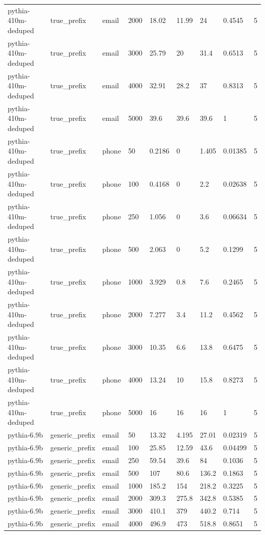 \begin{tabular}{lllllllll}
pythia-410m-deduped & true\_prefix & email & 2000 & 18.02 & 11.99 & 24 & 0.4545 & 5 \\
pythia-410m-deduped & true\_prefix & email & 3000 & 25.79 & 20 & 31.4 & 0.6513 & 5 \\
pythia-410m-deduped & true\_prefix & email & 4000 & 32.91 & 28.2 & 37 & 0.8313 & 5 \\
pythia-410m-deduped & true\_prefix & email & 5000 & 39.6 & 39.6 & 39.6 & 1 & 5 \\
pythia-410m-deduped & true\_prefix & phone & 50 & 0.2186 & 0 & 1.405 & 0.01385 & 5 \\
pythia-410m-deduped & true\_prefix & phone & 100 & 0.4168 & 0 & 2.2 & 0.02638 & 5 \\
pythia-410m-deduped & true\_prefix & phone & 250 & 1.056 & 0 & 3.6 & 0.06634 & 5 \\
pythia-410m-deduped & true\_prefix & phone & 500 & 2.063 & 0 & 5.2 & 0.1299 & 5 \\
pythia-410m-deduped & true\_prefix & phone & 1000 & 3.929 & 0.8 & 7.6 & 0.2465 & 5 \\
pythia-410m-deduped & true\_prefix & phone & 2000 & 7.277 & 3.4 & 11.2 & 0.4562 & 5 \\
pythia-410m-deduped & true\_prefix & phone & 3000 & 10.35 & 6.6 & 13.8 & 0.6475 & 5 \\
pythia-410m-deduped & true\_prefix & phone & 4000 & 13.24 & 10 & 15.8 & 0.8273 & 5 \\
pythia-410m-deduped & true\_prefix & phone & 5000 & 16 & 16 & 16 & 1 & 5 \\
pythia-6.9b & generic\_prefix & email & 50 & 13.32 & 4.195 & 27.01 & 0.02319 & 5 \\
pythia-6.9b & generic\_prefix & email & 100 & 25.85 & 12.59 & 43.6 & 0.04499 & 5 \\
pythia-6.9b & generic\_prefix & email & 250 & 59.54 & 39.6 & 84 & 0.1036 & 5 \\
pythia-6.9b & generic\_prefix & email & 500 & 107 & 80.6 & 136.2 & 0.1863 & 5 \\
pythia-6.9b & generic\_prefix & email & 1000 & 185.2 & 154 & 218.2 & 0.3225 & 5 \\
pythia-6.9b & generic\_prefix & email & 2000 & 309.3 & 275.8 & 342.8 & 0.5385 & 5 \\
pythia-6.9b & generic\_prefix & email & 3000 & 410.1 & 379 & 440.2 & 0.714 & 5 \\
pythia-6.9b & generic\_prefix & email & 4000 & 496.9 & 473 & 518.8 & 0.8651 & 5 \\

\end{tabular}
